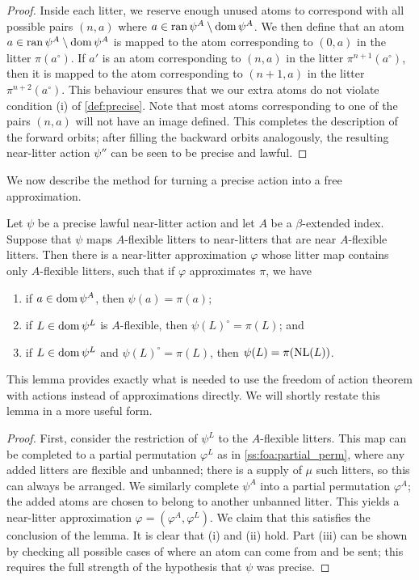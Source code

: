 \begin{proof}
    Inside each litter, we reserve enough unused atoms to correspond with all possible pairs \( (n, a) \) where \( a \in \operatorname{ran} \psi^A \setminus \operatorname{dom} \psi^A \).
    We then define that an atom \( a \in \operatorname{ran} \psi^A \setminus \operatorname{dom} \psi^A \) is mapped to the atom corresponding to \( (0, a) \) in the litter \( \pi(a^\circ) \).
    If \( a' \) is an atom corresponding to \( (n, a) \) in the litter \( \pi^{n+1}(a^\circ) \), then it is mapped to the atom corresponding to \( (n+1, a) \) in the litter \( \pi^{n+2}(a^\circ) \).
    This behaviour ensures that we our extra atoms do not violate condition (i) of \cref{def:precise}.
    Note that most atoms corresponding to one of the pairs \( (n, a) \) will not have an image defined.
    This completes the description of the forward orbits; after filling the backward orbits analogously, the resulting near-litter action \( \psi'' \) can be seen to be precise and lawful.
\end{proof}

We now describe the method for turning a precise action into a free approximation.

\begin{lemma}
    \label{lem:foa:nl_action_to_approx}
    Let \( \psi \) be a precise lawful near-litter action and let \( A \) be a \( \beta \)-extended index.
    Suppose that \( \psi \) maps \( A \)-flexible litters to near-litters that are near \( A \)-flexible litters.
    Then there is a near-litter approximation \( \varphi \) whose litter map contains only \( A \)-flexible litters, such that if \( \varphi \) approximates \( \pi \), we have
    \begin{enumerate}
        \item if \( a \in \operatorname{dom} \psi^A \), then \( \psi(a) = \pi(a) \);
        \item if \( L \in \operatorname{dom} \psi^L \) is \( A \)-flexible, then \( \psi(L)^\circ = \pi(L) \); and
        \item if \( L \in \operatorname{dom} \psi^L \) and \( \psi(L)^\circ = \pi(L) \), then \( \psi(L) = \pi(\operatorname{NL}(L)) \).
    \end{enumerate}
\end{lemma}
This lemma provides exactly what is needed to use the freedom of action theorem with actions instead of approximations directly.
We will shortly restate this lemma in a more useful form.
\begin{proof}
    First, consider the restriction of \( \psi^L \) to the \( A \)-flexible litters.
    This map can be completed to a partial permutation \( \varphi^L \) as in \cref{ss:foa:partial_perm}, where any added litters are flexible and unbanned; there is a supply of \( \mu \) such litters, so this can always be arranged.
    We similarly complete \( \psi^A \) into a partial permutation \( \varphi^A \); the added atoms are chosen to belong to another unbanned litter.
    This yields a near-litter approximation \( \varphi = (\varphi^A, \varphi^L) \).
    We claim that this satisfies the conclusion of the lemma.
    It is clear that (i) and (ii) hold.
    Part (iii) can be shown by checking all possible cases of where an atom can come from and be sent; this requires the full strength of the hypothesis that \( \psi \) was precise.
\end{proof}

